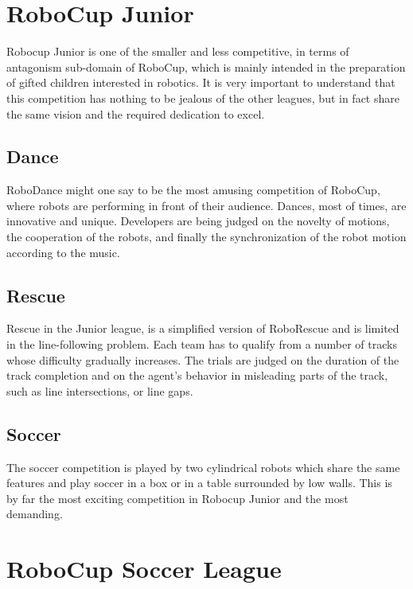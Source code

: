 \section{RoboCup Junior}

Robocup Junior is one of the smaller and less competitive, in terms of antagonism sub-domain of RoboCup, which is mainly intended in the preparation of gifted children interested in robotics. It is very important to understand that this competition has nothing to be jealous of the other leagues, but in fact share the same vision and the required dedication to excel.

\subsection{Dance}

RoboDance might one say to be the most amusing competition of RoboCup, where robots are performing in front of their audience. Dances, most of times, are innovative and unique. Developers are being judged on the novelty of motions, the cooperation of the robots, and finally the synchronization of the robot motion according to the music.

\subsection{Rescue}

Rescue in the Junior league, is a simplified version of RoboRescue and is limited in the line-following problem. Each team has to qualify from a number of tracks whose difficulty gradually increases. The trials are judged on the duration of the track completion and on the agent's behavior in misleading parts of the track, such as line intersections, or line gaps.

\subsection{Soccer}

The soccer competition is played by two cylindrical robots which share the same features and play soccer in a box or in a table surrounded by low walls. This is by far the most exciting competition in Robocup Junior and the most demanding.


\section{RoboCup Soccer League}

